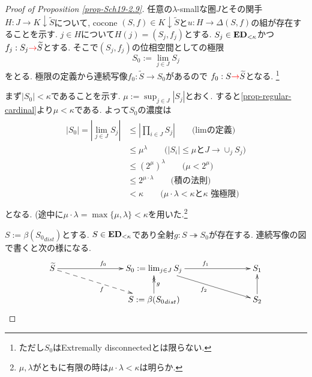 \documentclass[dvipdfmx,a4paper,11pt]{article}
\theoremstyle{definition}
\newcommand{\xr}[1]{\textcolor{red}{#1}}
\begin{document}
\begin{proof}[Proof of Proposition \ref{prop-Sch19-2.9}]
任意の$\lambda$-smallな圏$J$とその関手$H : J \to K \downarrow \widetilde{S}$について, cocone $(S,f) \in K \downarrow \widetilde{S}$と$u : H \to \Delta (S,f)$の組が存在することを示す.
$j \in H$について$H(j) = (S_j,f_j)$とする. 
$S_j \in {\bf ED}_{<\kappa}$かつ$f_j :  S_{j} \xr{\to} \widetilde{S}$とする.
そこで$(S_j,f_j)$の位相空間としての極限
$$
S_0 := \lim_{j \in J}S_j
$$
をとる. 
極限の定義から連続写像$f_0 : \widetilde{S} \to S_0$があるので
$f_0 : S \xr{\to} \widetilde{S}$となる. \footnote{ただし$S_0$はExtremally disconnectedとは限らない.}

まず$|S_0| < \kappa$であることを示す.
$\mu := \sup_{j \in J} |S_j|$とおく. 
すると\ref{prop-regular-cardinal}より$\mu < \kappa$である.
よって$S_0$の濃度は
\begin{align*}
\begin{split}
|S_0| = | \lim_{j \in J} S_j| 
&\le |\prod_{i \in J} S_j|   \quad\quad \text{(limの定義)}\\
&\le \mu^{\lambda} \quad\quad \text{($|S_i| \le \mu$と$J \to \cup_{j}S_j$)}\\
&\le (2^{\mu})^{\lambda} \quad\quad \text{($\mu < 2^{\mu}$)}\\
&\le 2^{\mu \cdot \lambda}\quad\quad \text{(積の法則)}\\
&< \kappa \quad\quad \text{($\mu \cdot \lambda < \kappa$と$\kappa$ 強極限)}\\
\end{split}
\end{align*}
となる. (途中に$\mu \cdot \lambda =\max \{\mu, \lambda \} < \kappa$を用いた.\footnote{$\mu,  \lambda $がともに有限の時は$\mu \cdot \lambda < \kappa$は明らか. }

$S := \beta ({S_0}_{dist})$とする. %
$S \in {\bf ED}_{< \kappa}$であり全射$g : S \twoheadrightarrow  S_0$が存在する. 
連続写像の図で書くと次の様になる. %
\begin{equation}
\label{eq-conti}
\xymatrix@C=78pt@R=20pt{
\widetilde{S} \ar@{->}[r]^{f_0}\ar@{-->}[rd]_{f} 
&S_0:= \lim_{j \in J}S_j \ar@{->}[rd]_{f_2}  \ar@{->}[r]^{f_1} 
& S_1 
\\
&S := \beta ({S_0}_{dist}) \ar@{->>}[u]_{g} 
&
S_2\ar@{->}[u] 
}
\end{equation}


\end{proof}
\end{document}
